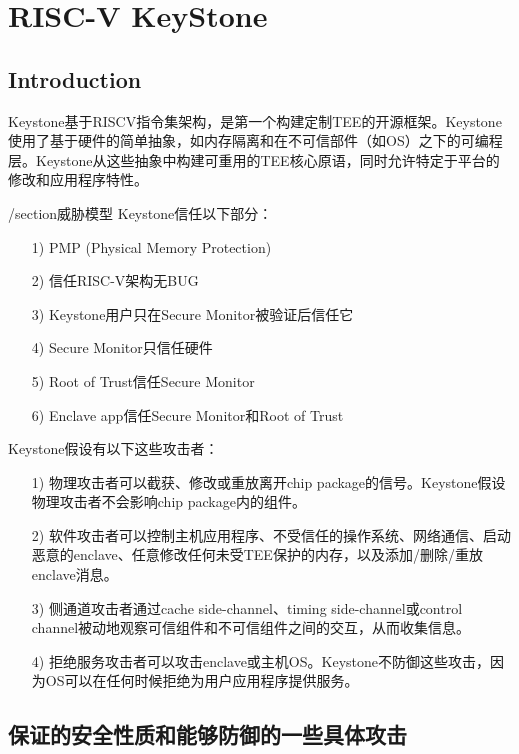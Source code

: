 
\chapter{RISC-V KeyStone} %

\label{Chapter4} %

\section{Introduction}
Keystone基于RISCV指令集架构，是第一个构建定制TEE的开源框架。Keystone使用了基于硬件的简单抽象，如内存隔离和在不可信部件（如OS）之下的可编程层。Keystone从这些抽象中构建可重用的TEE核心原语，同时允许特定于平台的修改和应用程序特性。

/section{威胁模型}
Keystone信任以下部分：
\begin{itemize}
	\item [1)]
	PMP (Physical Memory Protection)
	\item [2)]
	信任RISC-V架构无BUG
	\item [3)]
	Keystone用户只在Secure Monitor被验证后信任它
	\item [4)]
	Secure Monitor只信任硬件
	\item [5)]
	Root of Trust信任Secure Monitor
	\item [6)]
	Enclave app信任Secure Monitor和Root of Trust
\end{itemize}
Keystone假设有以下这些攻击者：
\begin{itemize}
	\item [1)]
	物理攻击者可以截获、修改或重放离开chip package的信号。Keystone假设物理攻击者不会影响chip package内的组件。
	\item [2)]
	软件攻击者可以控制主机应用程序、不受信任的操作系统、网络通信、启动恶意的enclave、任意修改任何未受TEE保护的内存，以及添加/删除/重放enclave消息。
	\item [3)]
	侧通道攻击者通过cache side-channel、timing side-channel或control channel被动地观察可信组件和不可信组件之间的交互，从而收集信息。
	\item [4)]	
	拒绝服务攻击者可以攻击enclave或主机OS。Keystone不防御这些攻击，因为OS可以在任何时候拒绝为用户应用程序提供服务。
\end{itemize}

\section{保证的安全性质和能够防御的一些具体攻击}
